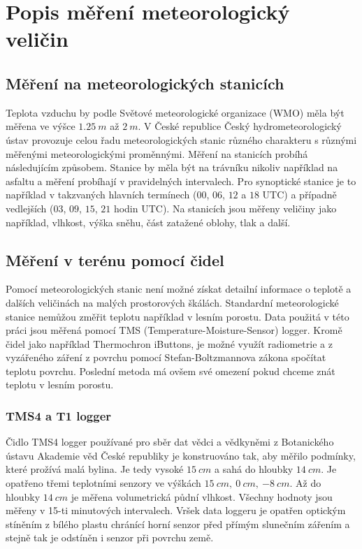 \section{Popis měření meteorologický veličin} \label{chap:measure}
\subsection{Měření na meteorologických stanicích}\label{chap:meteostations}
Teplota vzduchu by podle Světové meteorologické organizace (WMO) měla být měřena ve výšce $\SI{1.25}{m}$ až $\SI{2}{m}$\cite{wmoGuidance2021}. V České republice Český hydrometeorologický ústav provozuje celou řadu meteorologických stanic různého charakteru s různými měřenými meteorologickými proměnnými. Měření na stanicích probíhá následujícím způsobem. Stanice by měla být na trávníku nikoliv například na asfaltu a měření probíhají v pravidelných intervalech. Pro synoptické stanice je to například v takzvaných hlavních termínech ($00$, $06$, $12$ a $18$ UTC) a případně vedlejších ($03$, $09$, $15$, $21$ hodin UTC). Na stanicích jsou měřeny veličiny jako například, vlhkost, výška sněhu, část zatažené oblohy, tlak a další\cite{chmustanice}. 

\subsection{Měření v terénu pomocí čidel}
Pomocí meteorologických stanic není možné získat detailní informace o teplotě a dalších veličinách na malých prostorových škálách. Standardní meteorologické stanice nemůžou změřit teplotu například v lesním porostu. Data použitá v této práci jsou měřená pomocí TMS (Temperature-Moisture-Sensor) logger. Kromě čidel jako například Thermochron iButtons, je možné využít radiometrie a z vyzářeného záření z povrchu pomocí Stefan-Boltzmannova zákona spočítat teplotu povrchu. Poslední metoda má ovšem své omezení pokud chceme znát teplotu v lesním porostu. 

\subsubsection{TMS4 a T1 logger} \label{chap:loggers}
Čidlo TMS4 logger používané pro sběr dat vědci a vědkyněmi z Botanického ústavu Akademie věd České republiky je konstruováno tak, aby měřilo podmínky, které prožívá malá bylina. Je tedy vysoké $\SI{15}{cm}$ a sahá do hloubky $\SI{14}{cm}$. Je opatřeno třemi teplotními senzory ve výškách $\SI{15}{cm},\ \SI{0}{cm},\ \SI{-8}{cm}$. Až do hloubky $\SI{14}{cm}$ je měřena volumetrická půdní vlhkost. Všechny hodnoty jsou měřeny v 15-ti minutových intervalech. Vršek data loggeru je opatřen optickým stíněním z bílého plastu chránící horní senzor před přímým slunečním zářením a stejně tak je odstíněn i senzor při povrchu země. 


